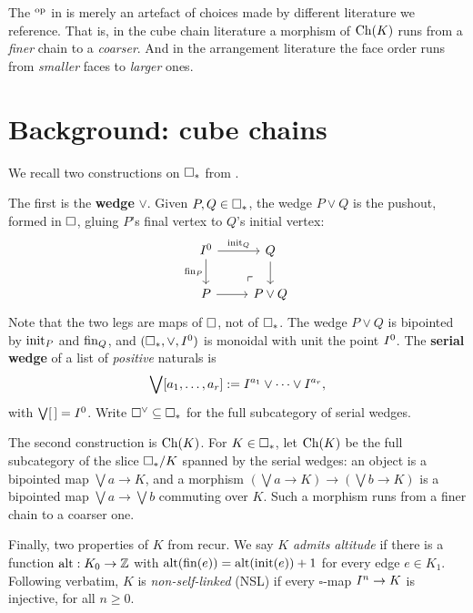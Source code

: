 \documentclass[11pt]{article}
\begin{document}
\begin{remark}[Variance]\label{rem:variance}
The $^{\mathrm{op}}$ in  is merely an artefact of choices made by different 
literature we reference. That is, in the cube chain literature 
\cite{PZ, Z2} a morphism of $\operatorname{Ch}(K)$ runs from a \emph{finer} chain to
a \emph{coarser}. And in the arrangement literature \cite{Paris} the face
order runs from \emph{smaller} faces to \emph{larger} ones. 
\end{remark}

\section{Background: cube chains}\label{sec:background}

We recall two constructions on $\square_{*}$ from \cite{PZ, Z2}.

The first is the \textbf{wedge} $\vee$. Given $P, Q \in \square_{*}$, the wedge $P \vee Q$ is the
pushout, formed in $\square$, gluing $P$'s final vertex to $Q$'s initial vertex:
\[
\begin{tikzcd}
  \cube{0} \arrow[r, "\init_Q"] \arrow[d, "\fin_P"'] & Q \arrow[d] \\
  P \arrow[r] & P \vee Q \arrow[ul, phantom, very near start, "\ulcorner"]
\end{tikzcd}
\]
Note that the two legs are maps of $\square$, not of $\square_{*}$. The wedge $P \vee Q$ is bipointed by
$\operatorname{init}_P$ and $\operatorname{fin}_Q$, and $(\square_{*}, \vee, I^{0})$ is monoidal with unit the point $I^{0}$.
The \textbf{serial wedge} of a list of \emph{positive} naturals is
\[
  \bigvee[a_1, \dots, a_r] := I^{a_1} \vee \cdots \vee I^{a_r},
\]
with $\bigvee[\,] = I^{0}$. Write $\square^{\vee} \subseteq \square_{*}$ for the full subcategory of serial
wedges.

The second construction is $\operatorname{Ch}(K)$. For $K \in \square_{*}$, let $\operatorname{Ch}(K)$ be the full subcategory of the slice $\square_{*} / K$ spanned by the
serial wedges: an object is a bipointed map $\bigvee a \to K$, and a morphism
$(\bigvee a \to K) \to (\bigvee b \to K)$ is a bipointed map $\bigvee a \to \bigvee b$ commuting
over $K$. Such a morphism runs from a finer chain to a coarser one.

Finally, two properties of $K$ from \cite{PZ} recur. We say $K$ \emph{admits altitude} if there is
a function $\operatorname{alt} : K_0 \to \mathbb{Z}$ with $\operatorname{alt}(\operatorname{fin}(e)) = \operatorname{alt}(\operatorname{init}(e)) + 1$ for every edge
$e \in K_1$. Following \cite[\S2]{PZ} verbatim, $K$ is \emph{non-self-linked} (NSL) if every
$\square$-map $I^{n} \to K$ is injective, for all $n \ge 0$. 
\end{document}
